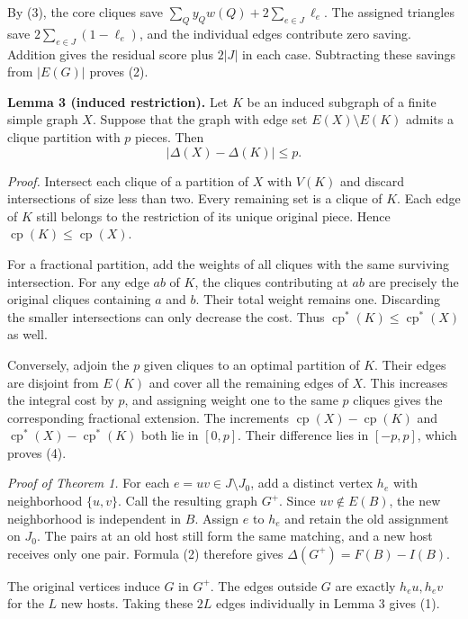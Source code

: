 \documentclass[english,11pt,a4paper]{article}
\begin{document}
By (3), the core cliques save \(\sum_Q y_Qw(Q)+2\sum_{e\in J}\ell_e\). The assigned triangles save \(2\sum_{e\in J}(1-\ell_e)\), and the individual edges contribute zero saving. Addition gives the residual score plus \(2|J|\) in each case. Subtracting these savings from \(|E(G)|\) proves (2).

\textbf{Lemma 3 (induced restriction).} Let \(K\) be an induced subgraph of a finite simple graph \(X\). Suppose that the graph with edge set \(E(X)\setminus E(K)\) admits a clique partition with \(p\) pieces. Then
\[
|\Delta(X)-\Delta(K)|\le p. \tag{4}
\]

\emph{Proof.} Intersect each clique of a partition of \(X\) with \(V(K)\) and discard intersections of size less than two. Every remaining set is a clique of \(K\). Each edge of \(K\) still belongs to the restriction of its unique original piece. Hence \(\operatorname{cp}(K)\le\operatorname{cp}(X)\).

For a fractional partition, add the weights of all cliques with the same surviving intersection. For any edge \(ab\) of \(K\), the cliques contributing at \(ab\) are precisely the original cliques containing \(a\) and \(b\). Their total weight remains one. Discarding the smaller intersections can only decrease the cost. Thus \(\operatorname{cp}^{\ast}(K)\le\operatorname{cp}^{\ast}(X)\) as well.

Conversely, adjoin the \(p\) given cliques to an optimal partition of \(K\). Their edges are disjoint from \(E(K)\) and cover all the remaining edges of \(X\). This increases the integral cost by \(p\), and assigning weight one to the same \(p\) cliques gives the corresponding fractional extension. The increments \(\operatorname{cp}(X)-\operatorname{cp}(K)\) and \(\operatorname{cp}^{\ast}(X)-\operatorname{cp}^{\ast}(K)\) both lie in \([0,p]\). Their difference lies in \([-p,p]\), which proves (4).

\emph{Proof of Theorem 1.} For each \(e=uv\in J\setminus J_0\), add a distinct vertex \(h_e\) with neighborhood \(\{u,v\}\). Call the resulting graph \(G^+\). Since \(uv\notin E(B)\), the new neighborhood is independent in \(B\). Assign \(e\) to \(h_e\) and retain the old assignment on \(J_0\). The pairs at an old host still form the same matching, and a new host receives only one pair. Formula (2) therefore gives \(\Delta(G^+)=F(B)-I(B)\).

The original vertices induce \(G\) in \(G^+\). The edges outside \(G\) are exactly \(h_eu,h_ev\) for the \(L\) new hosts. Taking these \(2L\) edges individually in Lemma 3 gives (1).
\end{document}

